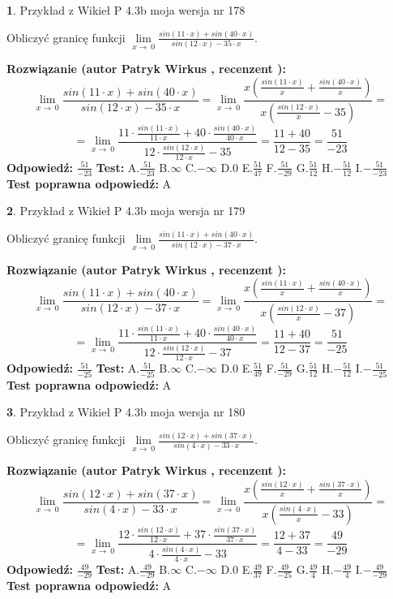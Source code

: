 \documentclass[12pt, a4paper]{article}
\theoremstyle{definition} %
\newtheorem{zad}{}
\newcommand{\zadStart}[1]{\begin{zad}#1\newline}
\newcommand{\zadStop}{\end{zad}}
\newcommand{\rozwStart}[2]{\noindent \textbf{Rozwiązanie (autor #1 , recenzent #2): }\newline}
\newcommand{\rozwStop}{\newline}
\newcommand{\odpStart}{\noindent \textbf{Odpowiedź:}\newline}
\newcommand{\odpStop}{\newline}
\newcommand{\testStart}{\noindent \textbf{Test:}\newline}
\newcommand{\testStop}{\newline}
\newcommand{\kluczStart}{\noindent \textbf{Test poprawna odpowiedź:}\newline}
\newcommand{\kluczStop}{\newline}
\begin{document}
\zadStart{Przykład z Wikieł P 4.3b moja wersja nr 178}


Obliczyć granicę funkcji $\lim\limits_{x\to\ 0}\frac{sin(11 \cdot x)+sin(40 \cdot x)}{sin(12 \cdot x)-35 \cdot x}$.
\zadStop
\rozwStart{Patryk Wirkus}{}
$$\lim\limits_{x\to\ 0}\frac{sin(11 \cdot x)+sin(40 \cdot x)}{sin(12 \cdot x)-35 \cdot x}=\lim\limits_{x\to\ 0}\frac{x(\frac{sin(11 \cdot x)}{x}+\frac{sin(40 \cdot x)}{x})}{x(\frac{sin(12 \cdot x)}{x}-35)}=$$
$$=\lim\limits_{x\to\ 0}\frac{11 \cdot \frac{sin(11 \cdot x)}{11 \cdot x}+40 \cdot \frac{sin(40 \cdot x)}{40 \cdot x}}{12 \cdot \frac{sin(12 \cdot x)}{12 \cdot x}-35}=\frac{11+40}{12-35} = \frac{51}{-23}$$
\rozwStop
\odpStart
$\frac{51}{-23}$
\odpStop
\testStart
A.$\frac{51}{-23}$
B.$\infty$
C.$-\infty$
D.$0$
E.$\frac{51}{47}$
F.$\frac{51}{-29}$
G.$\frac{51}{12}$
H.$-\frac{51}{12}$
I.$-\frac{51}{-23}$
\testStop
\kluczStart
A
\kluczStop



\zadStart{Przykład z Wikieł P 4.3b moja wersja nr 179}


Obliczyć granicę funkcji $\lim\limits_{x\to\ 0}\frac{sin(11 \cdot x)+sin(40 \cdot x)}{sin(12 \cdot x)-37 \cdot x}$.
\zadStop
\rozwStart{Patryk Wirkus}{}
$$\lim\limits_{x\to\ 0}\frac{sin(11 \cdot x)+sin(40 \cdot x)}{sin(12 \cdot x)-37 \cdot x}=\lim\limits_{x\to\ 0}\frac{x(\frac{sin(11 \cdot x)}{x}+\frac{sin(40 \cdot x)}{x})}{x(\frac{sin(12 \cdot x)}{x}-37)}=$$
$$=\lim\limits_{x\to\ 0}\frac{11 \cdot \frac{sin(11 \cdot x)}{11 \cdot x}+40 \cdot \frac{sin(40 \cdot x)}{40 \cdot x}}{12 \cdot \frac{sin(12 \cdot x)}{12 \cdot x}-37}=\frac{11+40}{12-37} = \frac{51}{-25}$$
\rozwStop
\odpStart
$\frac{51}{-25}$
\odpStop
\testStart
A.$\frac{51}{-25}$
B.$\infty$
C.$-\infty$
D.$0$
E.$\frac{51}{49}$
F.$\frac{51}{-29}$
G.$\frac{51}{12}$
H.$-\frac{51}{12}$
I.$-\frac{51}{-25}$
\testStop
\kluczStart
A
\kluczStop



\zadStart{Przykład z Wikieł P 4.3b moja wersja nr 180}


Obliczyć granicę funkcji $\lim\limits_{x\to\ 0}\frac{sin(12 \cdot x)+sin(37 \cdot x)}{sin(4 \cdot x)-33 \cdot x}$.
\zadStop
\rozwStart{Patryk Wirkus}{}
$$\lim\limits_{x\to\ 0}\frac{sin(12 \cdot x)+sin(37 \cdot x)}{sin(4 \cdot x)-33 \cdot x}=\lim\limits_{x\to\ 0}\frac{x(\frac{sin(12 \cdot x)}{x}+\frac{sin(37 \cdot x)}{x})}{x(\frac{sin(4 \cdot x)}{x}-33)}=$$
$$=\lim\limits_{x\to\ 0}\frac{12 \cdot \frac{sin(12 \cdot x)}{12 \cdot x}+37 \cdot \frac{sin(37 \cdot x)}{37 \cdot x}}{4 \cdot \frac{sin(4 \cdot x)}{4 \cdot x}-33}=\frac{12+37}{4-33} = \frac{49}{-29}$$
\rozwStop
\odpStart
$\frac{49}{-29}$
\odpStop
\testStart
A.$\frac{49}{-29}$
B.$\infty$
C.$-\infty$
D.$0$
E.$\frac{49}{37}$
F.$\frac{49}{-25}$
G.$\frac{49}{4}$
H.$-\frac{49}{4}$
I.$-\frac{49}{-29}$
\testStop
\kluczStart
A
\kluczStop
\end{document}
